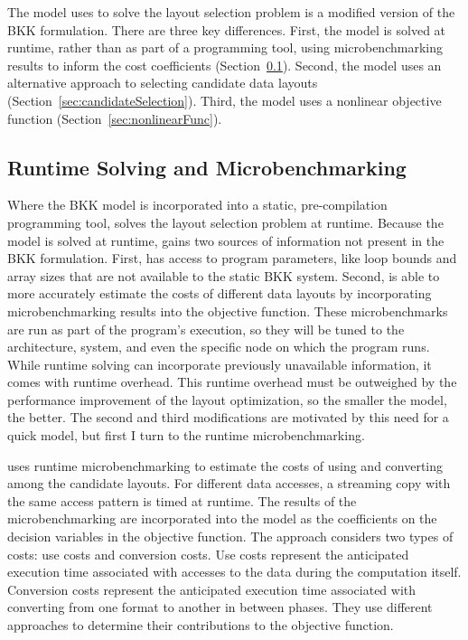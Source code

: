 The model \FormatDecisions{} uses to solve the layout selection problem is a modified version of the BKK formulation.
There are three key differences.
First, the model is solved at runtime, rather than as part of a programming tool, using microbenchmarking results to inform the cost coefficients (Section~\ref{sec:microbenchmarking}).
Second, the model uses an alternative approach to selecting candidate data layouts (Section~\ref{sec:candidateSelection}).
Third, the model uses a nonlinear objective function (Section~\ref{sec:nonlinearFunc}).

\subsection{Runtime Solving and Microbenchmarking}\label{sec:microbenchmarking}

Where the BKK model is incorporated into a static, pre-compilation programming tool, \FormatDecisions{} solves the layout selection problem at runtime.
Because the model is solved at runtime, \FormatDecisions{} gains two sources of information not present in the BKK formulation.
First, \FormatDecisions{} has access to program parameters, like loop bounds and array sizes that are not available to the static BKK system.
Second, \FormatDecisions{} is able to more accurately estimate the costs of different data layouts by incorporating microbenchmarking results into the objective function.
These microbenchmarks are run as part of the program's execution, so they will be tuned to the architecture, system, and even the specific node on which the program runs.
While runtime solving can incorporate previously unavailable information, it comes with runtime overhead.
This runtime overhead must be outweighed by the performance improvement of the layout optimization, so the smaller the model, the better.
The second and third modifications are motivated by this need for a quick model, but first I turn to the runtime microbenchmarking.

\FormatDecisions{} uses runtime microbenchmarking to estimate the costs of using and converting among the candidate layouts. 
For different data accesses, a streaming copy with the same access pattern is timed at runtime.
The results of the microbenchmarking are incorporated into the model as the coefficients on the decision variables in the objective function.
The approach considers two types of costs: use costs and conversion costs.
Use costs represent the anticipated execution time associated with accesses to the data during the computation itself.
Conversion costs represent the anticipated execution time associated with converting from one format to another in between phases.
They use different approaches to determine their contributions to the objective function.

